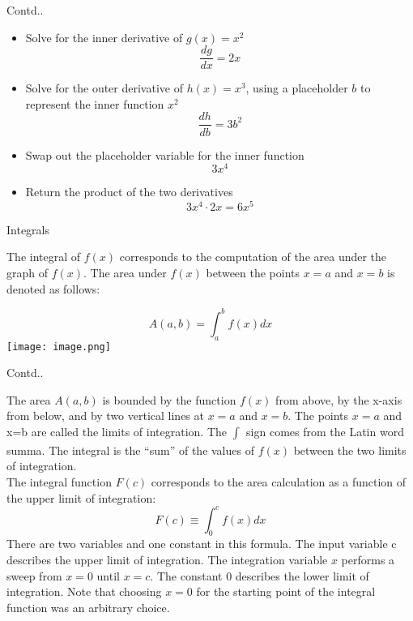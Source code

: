 \documentclass{beamer}
\begin{document}
\begin{frame}{Contd..}
	\begin{itemize}
		\item Solve for the inner derivative of $g(x) = x^2$
		$$\frac{dg}{dx} = 2x$$
		\item Solve for the outer derivative of $h(x) = x^3$, using a placeholder $b$ to represent the inner function $x^2$
		$$\frac{dh}{db} = 3b^2$$
		\item  Swap out the placeholder variable for the inner function
		$$3x^4$$
		\item Return the product of the two derivatives
		$$3x^4 \cdot 2x = 6x^5$$
	\end{itemize}
\end{frame}

\begin{frame}{Integrals}
	\begin{flushleft}
		The integral of $f(x)$ corresponds to the computation of the area under the graph of $f(x)$. The area under $f(x)$ between the points $x=a$ and $x=b$ is denoted as follows:
	\end{flushleft}
	$$A(a,b) =\int_{a}^{b} f(x)dx$$
	\texttt{[image: image.png]}
\end{frame}

\begin{frame}{Contd..}
	\begin{flushleft}
		The area $A(a,b)$ is bounded by the function $f(x)$ from above, by the x-axis from below, and by two vertical lines at $x=a$ and $x=b$. The points $x=a$ and x=b are called the limits of integration. The $\int_{}^{}$ sign comes from the Latin word summa. The integral is the “sum” of the values of $f(x)$ between the two limits of integration. \\
\vspace{10pt}
		The integral function $F(c)$ corresponds to the area calculation as a function of the upper limit of integration:
		$$F(c) \equiv \int_{0}^{c}f(x) dx$$
		There are two variables and one constant in this formula. The input variable c describes the upper limit of integration. The integration variable $x$ performs a sweep from $x=0$ until $x=c$. The constant 0 describes the lower limit of integration. Note that choosing $x=0$ for the starting point of the integral function was an arbitrary choice.
	\end{flushleft}
\end{frame}
\end{document}
